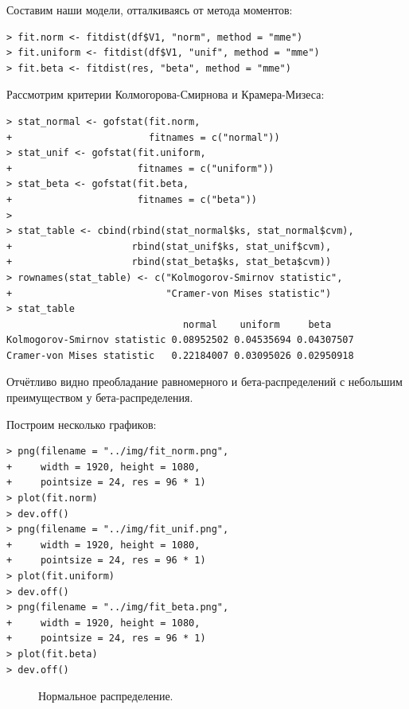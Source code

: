 \documentclass[14pt,a4paper]{scrartcl}
\begin{document}
Составим наши модели, отталкиваясь от метода моментов:
\begin{lstlisting}
> fit.norm <- fitdist(df$V1, "norm", method = "mme")
> fit.uniform <- fitdist(df$V1, "unif", method = "mme")
> fit.beta <- fitdist(res, "beta", method = "mme")
\end{lstlisting}

Рассмотрим критерии Колмогорова-Смирнова и Крамера-Мизеса:
\begin{lstlisting}
> stat_normal <- gofstat(fit.norm, 
+                        fitnames = c("normal"))
> stat_unif <- gofstat(fit.uniform, 
+                      fitnames = c("uniform"))
> stat_beta <- gofstat(fit.beta, 
+                      fitnames = c("beta"))
> 
> stat_table <- cbind(rbind(stat_normal$ks, stat_normal$cvm),  
+                     rbind(stat_unif$ks, stat_unif$cvm),
+                     rbind(stat_beta$ks, stat_beta$cvm))
> rownames(stat_table) <- c("Kolmogorov-Smirnov statistic", 
+                           "Cramer-von Mises statistic")
> stat_table
                               normal    uniform     beta
Kolmogorov-Smirnov statistic 0.08952502 0.04535694 0.04307507
Cramer-von Mises statistic   0.22184007 0.03095026 0.02950918
\end{lstlisting}

Отчётливо видно преобладание равномерного и бета-распределений с небольшим преимуществом у бета-распределения.

Построим несколько графиков:
\begin{lstlisting}
> png(filename = "../img/fit_norm.png", 
+     width = 1920, height = 1080,
+     pointsize = 24, res = 96 * 1)
> plot(fit.norm)
> dev.off()
> png(filename = "../img/fit_unif.png", 
+     width = 1920, height = 1080,
+     pointsize = 24, res = 96 * 1)
> plot(fit.uniform)
> dev.off() 
> png(filename = "../img/fit_beta.png", 
+     width = 1920, height = 1080,
+     pointsize = 24, res = 96 * 1)
> plot(fit.beta)
> dev.off()
\end{lstlisting}

\begin{figure}[h]
	\caption{Нормальное распределение.}
	\label{ris:fit_norm}
\end{figure}
\end{document}
